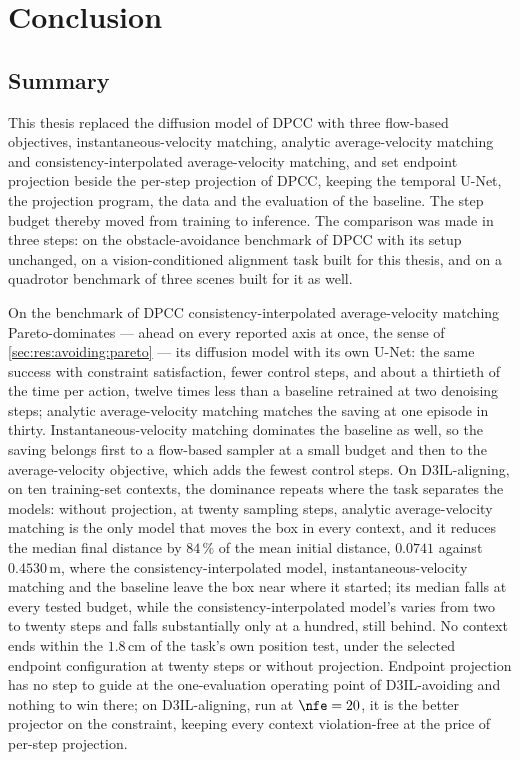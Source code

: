 \chapter{Conclusion}\label{ch:conclusion}

\section{Summary}\label{sec:conc:summary}

This thesis replaced the diffusion model of \ac{DPCC} with three flow-based objectives,
instantaneous-velocity matching, analytic average-velocity matching and consistency-interpolated
average-velocity matching, and set endpoint projection beside the per-step projection of \ac{DPCC},
keeping the temporal U-Net, the projection program, the data and the evaluation of the baseline. The
step budget thereby moved from training to inference. The comparison was made in three steps: on the
obstacle-avoidance benchmark of \ac{DPCC} with its setup unchanged, on a vision-conditioned alignment
task built for this thesis, and on a quadrotor benchmark of three scenes built for it as well.

On the benchmark of \ac{DPCC} consistency-interpolated average-velocity matching Pareto-dominates --- ahead on every reported axis at once, the sense of
\autoref{sec:res:avoiding:pareto} --- its
diffusion model with its own U-Net: the same success with constraint satisfaction, fewer control
steps, and about a thirtieth of the time per action, twelve times less than a baseline retrained at
two denoising steps; analytic average-velocity matching matches the saving at one episode in thirty.
Instantaneous-velocity matching dominates the baseline as well, so the saving belongs first to a
flow-based sampler at a small budget and then to the average-velocity objective, which adds the fewest
control steps. On D3IL-aligning, on ten training-set contexts, the dominance repeats where the task separates the models: without projection, at
twenty sampling steps, analytic average-velocity matching is the only model that moves the box in
every context, and it reduces the median final distance by $84\,\%$ of the mean initial distance,
$0.0741$ against $0.4530$\,m, where the consistency-interpolated model, instantaneous-velocity
matching and the baseline leave the box near where it started; its median falls at every tested
budget, while the consistency-interpolated model's varies from two to twenty steps and falls
substantially only at a hundred, still behind. No context ends within the $1.8$\,cm of the task's own
position test, under the selected endpoint configuration at twenty steps or without projection.
Endpoint projection has no step to guide at the one-evaluation operating point of D3IL-avoiding and
nothing to win there; on D3IL-aligning, run at $\nfe = 20$, it is the better projector on the
constraint, keeping every context violation-free at the price of per-step projection.

